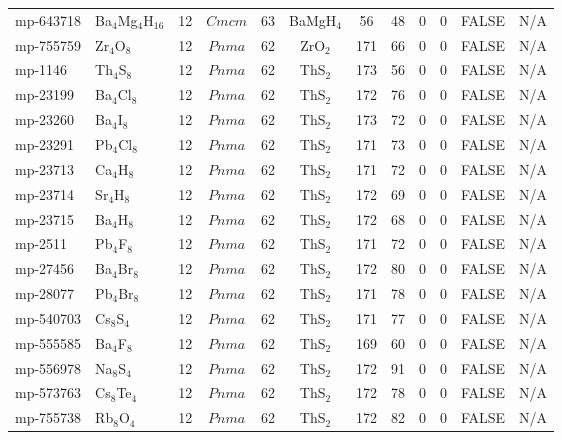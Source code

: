{\begin{longtable}{llcccccccccc}
    mp-643718 & Ba$_{4}$Mg$_{4}$H$_{16}$ & 12    & $Cmcm$ & 63    & BaMgH$_{4}$ & 56    & 48    & 0     & 0     & FALSE & N/A \\
    mp-755759 & Zr$_{4}$O$_{8}$ & 12    & $Pnma$ & 62    & ZrO$_{2}$ & 171   & 66    & 0     & 0     & FALSE & N/A \\
    mp-1146 & Th$_{4}$S$_{8}$ & 12    & $Pnma$ & 62    & ThS$_{2}$ & 173   & 56    & 0     & 0     & FALSE & N/A \\
    mp-23199 & Ba$_{4}$Cl$_{8}$ & 12    & $Pnma$ & 62    & ThS$_{2}$ & 172   & 76    & 0     & 0     & FALSE & N/A \\
    mp-23260 & Ba$_{4}$I$_{8}$ & 12    & $Pnma$ & 62    & ThS$_{2}$ & 173   & 72    & 0     & 0     & FALSE & N/A \\
    mp-23291 & Pb$_{4}$Cl$_{8}$ & 12    & $Pnma$ & 62    & ThS$_{2}$ & 171   & 73    & 0     & 0     & FALSE & N/A \\
    mp-23713 & Ca$_{4}$H$_{8}$ & 12    & $Pnma$ & 62    & ThS$_{2}$ & 171   & 72    & 0     & 0     & FALSE & N/A \\
    mp-23714 & Sr$_{4}$H$_{8}$ & 12    & $Pnma$ & 62    & ThS$_{2}$ & 172   & 69    & 0     & 0     & FALSE & N/A \\
    mp-23715 & Ba$_{4}$H$_{8}$ & 12    & $Pnma$ & 62    & ThS$_{2}$ & 172   & 68    & 0     & 0     & FALSE & N/A \\
    mp-2511 & Pb$_{4}$F$_{8}$ & 12    & $Pnma$ & 62    & ThS$_{2}$ & 171   & 72    & 0     & 0     & FALSE & N/A \\
    mp-27456 & Ba$_{4}$Br$_{8}$ & 12    & $Pnma$ & 62    & ThS$_{2}$ & 172   & 80    & 0     & 0     & FALSE & N/A \\
    mp-28077 & Pb$_{4}$Br$_{8}$ & 12    & $Pnma$ & 62    & ThS$_{2}$ & 171   & 78    & 0     & 0     & FALSE & N/A \\
    mp-540703 & Cs$_{8}$S$_{4}$ & 12    & $Pnma$ & 62    & ThS$_{2}$ & 171   & 77    & 0     & 0     & FALSE & N/A \\
    mp-555585 & Ba$_{4}$F$_{8}$ & 12    & $Pnma$ & 62    & ThS$_{2}$ & 169   & 60    & 0     & 0     & FALSE & N/A \\
    mp-556978 & Na$_{8}$S$_{4}$ & 12    & $Pnma$ & 62    & ThS$_{2}$ & 172   & 91    & 0     & 0     & FALSE & N/A \\
    mp-573763 & Cs$_{8}$Te$_{4}$ & 12    & $Pnma$ & 62    & ThS$_{2}$ & 172   & 78    & 0     & 0     & FALSE & N/A \\
    mp-755738 & Rb$_{8}$O$_{4}$ & 12    & $Pnma$ & 62    & ThS$_{2}$ & 172   & 82    & 0     & 0     & FALSE & N/A \\

\end{longtable}}
